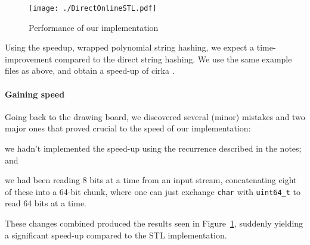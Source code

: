\documentclass[]{article}
\newcommand{\funk}[1]{\texttt{\small #1}}
\newcommand{\cpp}{C+\!+\xspace}
\begin{document}










\begin{figure}[H]
	\centering
	\texttt{[image: ./DirectOnlineSTL.pdf]}
	\caption{Performance of our implementation}
	\label{fig:hashcmp}
\end{figure}

Using the speedup, wrapped polynomial string hashing, we expect a time-improvement compared to the direct string hashing. We use the same example files as above, and obtain a speed-up of cirka . %

\paragraph{Gaining speed}

Going back to the drawing board, we discovered several (minor) mistakes and two major ones that proved crucial to the speed of our implementation:
\begin{inparaenum}[(1)]
\item we hadn't implemented the speed-up using the recurrence described in the notes; and
\item we had been reading 8 bits at a time from an input stream, concatenating eight of these into a 64-bit chunk, where one can just exchange \funk{char} with \funk{uint64\_t} to read 64 bits at a time.
\end{inparaenum}
These changes combined produced the results seen in Figure~\ref{fig:hashcmp}, suddenly yielding a significant speed-up compared to the STL implementation.
\end{document}
